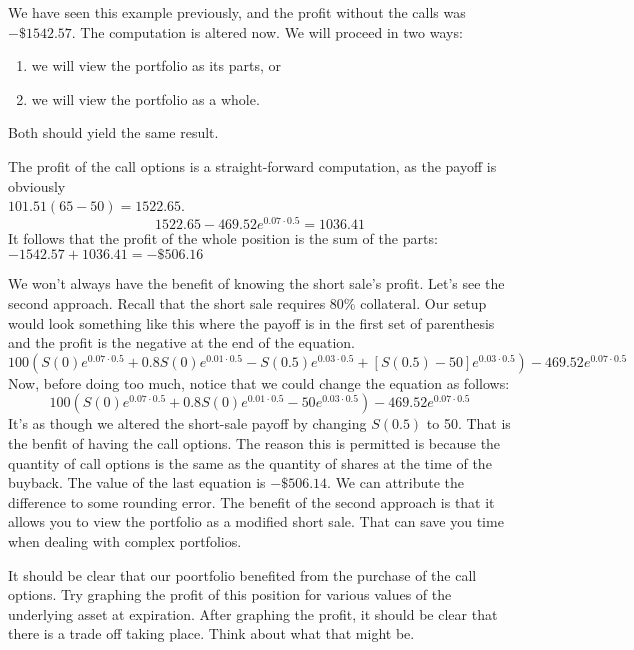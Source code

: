 \documentclass{ximera}
\begin{document}
\begin{solution}
We have seen this example previously, and the profit without the calls was $-\$1542.57$. The computation is altered now. We will proceed in two ways:
	\begin{enumerate}
	\item we will view the portfolio as its parts, or
	\item we will view the portfolio as a whole.	
	\end{enumerate}
Both should yield the same result.

The profit of the call options is a straight-forward computation, as the payoff is obviously\\
$101.51(65-50)=1522.65$.
	\begin{equation*}
	1522.65-469.52e^{0.07\cdot 0.5}=1036.41
	\end{equation*}
It follows that the profit of the whole position is the sum of the parts:\\
 $-1542.57+1036.41=-\$506.16$

We won't always have the benefit of knowing the short sale's profit. Let's see the second approach. Recall that the short sale requires 80\% collateral. Our setup would look something like this where the payoff is in the first set of parenthesis and the profit is the negative at the end of the equation.
	\begin{equation*}
	100\left(S(0)e^{0.07\cdot 0.5}+0.8S(0)e^{0.01\cdot 0.5}-S(0.5)e^{0.03\cdot 0.5}+[S(0.5)-50]e^{0.03\cdot 0.5}\right)-469.52e^{0.07\cdot 0.5}
	\end{equation*}
Now, before doing too much, notice that we could change the equation as follows:
	\begin{equation*}
	100\left(S(0)e^{0.07\cdot 0.5}+0.8S(0)e^{0.01\cdot 0.5}-50e^{0.03\cdot 0.5}\right)-469.52e^{0.07\cdot 0.5}
	\end{equation*}
It's as though we altered the short-sale payoff by changing $S(0.5)$ to 50. That is the benfit of having the call options. The reason this is permitted is because the quantity of call options is the same as the quantity of shares at the time of the buyback. The value of the last equation is $-\$506.14$. We can attribute the difference to some rounding error. The benefit of the second approach is that it allows you to view the portfolio as a modified short sale. That can save you time when dealing with complex portfolios.

It should be clear that our poortfolio benefited from the purchase of the call options. Try graphing the profit of this position for various values of the underlying asset at expiration. After graphing the profit, it should be clear that there is a trade off taking place. Think about what that might be.
\end{solution}
\end{document}

